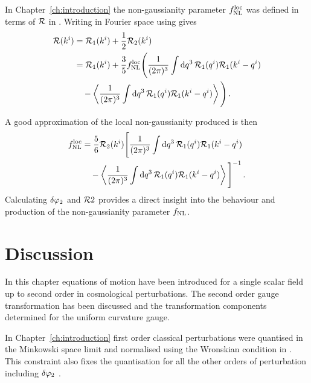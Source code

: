 In Chapter~\ref{ch:introduction} the non-gaussianity parameter $f_{\mathrm{NL}}^\mathrm{loc}$ was defined
in terms of $\mathcal{R}$ in . Writing  in
Fourier space using  gives
% 
\begin{align}
 \R(\kvi) &= \R_1(\kvi) + \frac{1}{2}\R_2(\kvi) \nonumber \\
% 
 &= \R_1(\kvi)
  + \frac{3}{5}\fnlloc \Bigg( \frac{1}{(2\pi)^3}\int \d q^3\, \R_1(\qvi)
\R_1(\kvi-\qvi) \\ \nonumber
% 
  &\quad- \left\langle \frac{1}{(2\pi)^3} \int \d q^3\, \R_1(\qvi)
\R_1(\kvi-\qvi) \right\rangle \Bigg) \,.
\end{align}

A good approximation of the local non-gaussianity produced is then 
% 
\begin{align}
 \label{eq:fnlloc-perts}
\fnlloc &= \frac{5}{6} \R_2(\kvi) \Bigg[ \frac{1}{(2\pi)^3}\int \d q^3\, \R_1(\qvi)
\R_1(\kvi-\qvi) \\ \nonumber
% 
  &\quad- \left\langle \frac{1}{(2\pi)^3} \int \d q^3\, \R_1(\qvi)
\R_1(\kvi-\qvi) \right\rangle \Bigg]^{-1} \,.
\end{align}
% 
Calculating $\delta\varphi_{2}$ and $\mathcal{R}2$ provides a direct insight into the behaviour and
production of the non-gaussianity parameter $f_{\mathrm{NL}}$. 

% 
% 
% 
% 
\section{Discussion}
\label{sec:disc-perts}

In this chapter equations of motion have been introduced for a single scalar field
up to second order in cosmological perturbations. The second order gauge
transformation has been discussed and the transformation components determined for
the uniform curvature gauge.

In Chapter~\ref{ch:introduction} first order classical perturbations were quantised
in the Minkowski space limit and normalised using the Wronskian condition in
. This constraint also fixes the quantisation for all
the other orders of perturbation including $\delta\varphi_{2}$ \cite{Seery:2008qj}. 

